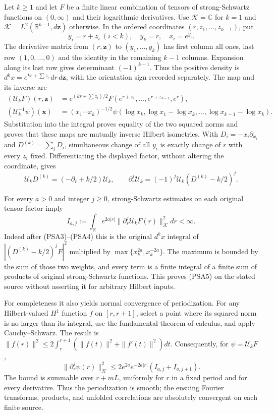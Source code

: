 \documentclass{article}
\begin{document}
Let $k\ge1$ and let $F$ be a finite linear combination of tensors of
strong-Schwartz functions on $(0,\infty)$ and their logarithmic
derivatives. Use $\mathcal K=\mathbb C$ for $k=1$ and
$\mathcal K=L^2(\mathbb R^{k-1},d\mathbf z)$ otherwise. In the ordered
coordinates $(r,z_1,\ldots,z_{k-1})$, put
\[
 y_i=r+z_i\ (i<k),\quad y_k=r,\quad x_i=e^{y_i}.
 \tag{PSA2}
\]
The derivative matrix from $(r,\mathbf z)$ to $(y_1,\ldots,y_k)$ has
first column all ones, last row $(1,0,\ldots,0)$ and the identity in the
remaining $k-1$ columns. Expansion along its last row gives determinant
$(-1)^{k-1}$. Thus the positive density is
$d^kx=e^{kr+\sum z_i}\,dr\,d\mathbf z$, with the orientation sign
recorded separately. The map and its inverse are
\[
 \begin{split}
 (\mathcal U_k F)(r,\mathbf z)
 &=e^{(kr+\sum z_i)/2}F(e^{r+z_1},\ldots,e^{r+z_{k-1}},e^r),\\
 (\mathcal U_k^{-1}\psi)(\mathbf x)
 &=(x_1\cdots x_k)^{-1/2}
 \psi(\log x_k,\log x_1-\log x_k,\ldots,
                  \log x_{k-1}-\log x_k).
 \end{split}
 \tag{PSA3}
\]
Substitution into the integral proves equality of the two squared
norms and proves that these maps are mutually inverse Hilbert
isometries. With $D_i=-x_i\partial_{x_i}$ and
$D^{(k)}=\sum_iD_i$, simultaneous change of all $y_i$ is exactly
change of $r$ with every $z_i$ fixed. Differentiating the displayed
factor, without altering the coordinate, gives
\[
 \mathcal U_kD^{(k)}=(-\partial_r+k/2)\mathcal U_k,
 \qquad
 \partial_r^j\mathcal U_k
 =(-1)^j\mathcal U_k(D^{(k)}-k/2)^j.
 \tag{PSA4}
\]

For every $a>0$ and integer $j\ge0$, strong-Schwartz estimates on each
original tensor factor imply
\[
 I_{a,j}:=\int_{\mathbb R} e^{2a|r|}
       \|\partial_r^j\mathcal U_kF(r)\|_{\mathcal K}^2dr<\infty.
 \tag{PSA5}
\]
Indeed after (PSA3)--(PSA4) this is the original $d^kx$ integral of
$|(D^{(k)}-k/2)^jF|^2$ multiplied by
$\max\{x_k^{2a},x_k^{-2a}\}$. The maximum is bounded by the sum of
those two weights, and every term is a finite integral of a finite sum
of products of original strong-Schwartz functions. This proves (PSA5)
on the stated source without asserting it for arbitrary Hilbert inputs.

For completeness it also yields normal convergence of periodization.
For any Hilbert-valued $H^1$ function $f$ on $[r,r+1]$, select a point
where its squared norm is no larger than its integral, use the
fundamental theorem of calculus, and apply Cauchy--Schwarz. The result is
$\|f(r)\|^2\le2\int_r^{r+1}(\|f(t)\|^2+\|f'(t)\|^2)dt$.
Consequently, for $\psi=\mathcal U_kF$,
\[
 \|\partial_r^j\psi(r)\|_{\mathcal K}^2
 \le 2e^{2a}e^{-2a|r|}(I_{a,j}+I_{a,j+1}).
 \tag{PSA6}
\]
The bound is summable over $r+mL$, uniformly for $r$ in a fixed
period and for every derivative. Thus the periodization is smooth;
the ensuing Fourier transforms, products, and unfolded correlations
are absolutely convergent on each finite source.
\end{document}
